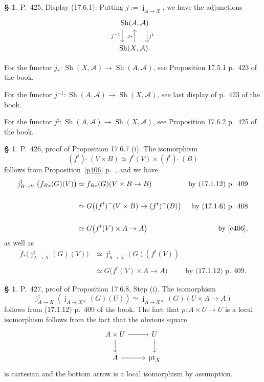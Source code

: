 \documentclass[12pt]{article}%
\theoremstyle{remark}
\theoremstyle{definition}
\newtheorem{s}[thm]{\S}%
\newcommand{\oo}{\operatorname}
\newcommand{\A}{\mathcal A}
\newcommand{\fthat}{(f^t)\ \widehat{}\ }
\begin{document}
\begin{s} 
P.~425, Display (17.6.1): Putting $j:=\oo j_{A\to X}$, we have the adjunctions 
$$
\begin{tikzcd}
\oo{Sh}(A,\A)\ar[xshift=-4ex]{d}[swap]{j^{-1}}\ar[xshift=4ex]{d}{j^\ddagger}\\ 
\oo{Sh}(X,\A).\ar{u}{j_*}
\end{tikzcd}
$$ 

For the functor $j_*:\oo{Sh}(X,\A)\to\oo{Sh}(A,\A)$, see Proposition 17.5.1 p.~423 of the book. 

For the functor $j^{-1}:\oo{Sh}(A,\A)\to\oo{Sh}(X,\A)$, see last display of p.~423 of the book. 

For the functor $j^\ddagger:\oo{Sh}(A,\A)\to\oo{Sh}(X,\A)$, see Proposition 17.6.2 p.~425 of the book.
\end{s}

%

\begin{s} 
P.~426, proof of Proposition 17.6.7 (i). The isomorphism 
\begin{equation}\label{e406}
\fthat(V\times B)\simeq f^t(V)\times\fthat(B)
\end{equation} 
follows from Proposition~\ref{p406} p.~\pageref{p406}, and we have 
\begin{align*} 
%
\oo j_{B\to Y}^\ddagger\big(f_{B*}(G)(V)\big)&\simeq f_{B*}(G)(V\times B\to B)&\text{by (17.1.12) p. 409}\\ \\ 
%
&\simeq G\big(\fthat(V\times B)\to\fthat(B)\big)&\text{by (17.1.6) p. 408}\\ \\ 
%
&\simeq G\big(f^t(V)\times A\to A\big)&\text{by \eqref{e406}}, 
% 
\end{align*} 
as well as 
\begin{align*} 
%
f_*\big(\oo j_{A\to X}^\ddagger(G)(V)\big)&\simeq\oo j_{A\to X}^\ddagger(G)(f^t(V))\\ \\ 
%
&\simeq G\big(f^t(V)\times A\to A\big)&\text{by (17.1.12) p. 409}. 
% 
\end{align*}  
\end{s} 

% 

\begin{s}\label{1768}
P.~427, proof of Proposition 17.6.8, Step (i). The isomorphism 
$$
\oo j_{A\to X}^\ddagger(\oo j_{A\to X*}(G)(U))\simeq\oo j_{A\to X*}(G)(U\times A\to A)
$$ 
follows from (17.1.12) p.~409 of the book. The fact that $p:A\times U\to U$ is a local isomorphism follows from the fact that the obvious square 
$$
\begin{tikzcd} 
A\times U\ar{r}\ar{d}&U\ar{d}\\ 
A\ar{r}&\oo{pt}_X
\end{tikzcd}
$$ 
is cartesian and the bottom arrow is a local isomorphism by assumption. 
\end{s} 
\end{document}
